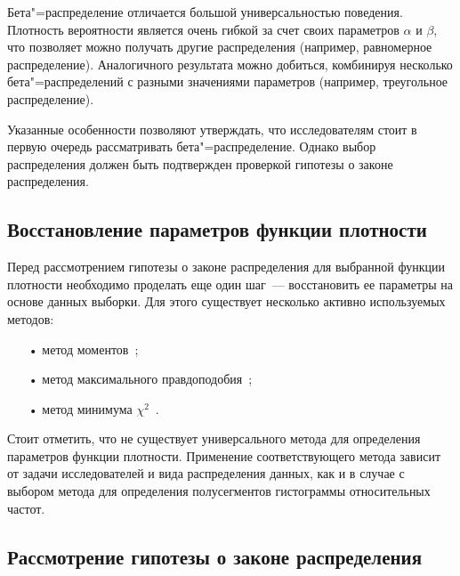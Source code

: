 \documentclass[a4paper, article, 14pt]{extarticle}
\begin{document}
Бета"=распределение отличается большой универсальностью поведения. Плотность вероятности является очень гибкой за счет своих параметров $\alpha$ и $\beta$, что позволяет можно получать другие распределения (например, равномерное распределение). Аналогичного результата можно добиться, комбинируя несколько бета"=распределений с разными значениями параметров (например, треугольное распределение).

Указанные особенности позволяют утверждать, что исследователям стоит в первую очередь рассматривать бета"=распределение. Однако выбор распределения должен быть подтвержден проверкой гипотезы о законе распределения.


\subsection{Восстановление параметров функции плотности}\label{sec:distribtuion_parameters}

Перед рассмотрением гипотезы о законе распределения для выбранной функции плотности необходимо проделать еще один шаг~--- восстановить ее параметры на основе данных выборки. Для этого существует несколько активно используемых методов:

\begin{enumerate}
	\item[•] метод моментов~\cite{prohorov, koroluk};
	
	\item[•] метод максимального правдоподобия~\cite{koroluk};
	
	\item[•] метод минимума $\chi^2$~\cite{koroluk}.
\end{enumerate}

Стоит отметить, что не существует универсального метода для определения параметров функции плотности. Применение соответствующего метода зависит от задачи исследователей и вида распределения данных, как и в случае с выбором метода для определения полусегментов гистограммы относительных частот.


\subsection{Рассмотрение гипотезы о законе распределения}\label{sec:distribtuion_hypothesys}
\end{document}
